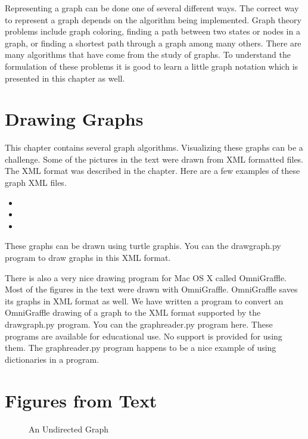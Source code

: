 \documentclass[letterpaper,10pt,english]{sphinxmanual}
\begin{document}
Representing a graph can be done one of several different ways. The correct way to represent a graph depends on the algorithm being implemented. Graph theory problems include graph coloring, finding a path between two states or nodes in a graph, or finding a shortest path through a graph among many others. There are many algorithms that have come from the study of graphs. To understand the formulation of these problems it is good to learn a little graph notation which is presented in this chapter as well.


\section{Drawing Graphs}
\label{\detokenize{chap7/chap7:drawing-graphs}}
This chapter contains several graph algorithms. Visualizing these graphs can be a challenge. Some of the pictures in the text were drawn from XML formatted files. The XML format was described in the chapter. Here are a few examples of these graph XML files.
\begin{itemize}
\item {} 

\item {} 

\item {} 

\end{itemize}

These graphs can be drawn using turtle graphis. You can  the drawgraph.py program to draw graphs in this XML format.

There is also a very nice drawing program for Mac OS X called OmniGraffle. Most of the figures in the text were drawn with OmniGraffle. OmniGraffle saves its graphs in XML format as well. We have written a program to convert an OmniGraffle drawing of a graph to the XML format supported by the drawgraph.py program. You can  the graphreader.py program here. These programs are available  for educational use. No support is provided for using them. The graphreader.py program happens to be a nice example of using dictionaries in a program.


\section{Figures from Text}
\label{\detokenize{chap7/chap7:figures-from-text}}
\begin{figure}[htbp]
\centering
\capstart

\noindent{}
\caption{An Undirected Graph}\label{\detokenize{chap7/chap7:id1}}\end{figure}
\end{document}
